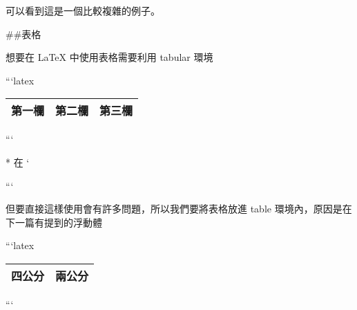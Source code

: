 \begin{markdown}
可以看到這是一個比較複雜的例子。

##表格

想要在 LaTeX 中使用表格需要利用 tabular 環境

```latex
\begin{tabular}{| c | l r |}
\hline
第一欄 & 第二欄 & 第三欄 \\
\hline
\end{tabular}
```

* 在 `
```

但要直接這樣使用會有許多問題，所以我們要將表格放進 table 環境內，原因是在下一篇有提到的浮動體

```latex
\begin{table}
\begin{tabular}{|p{4cm}|p{2cm}|}
\hline
四公分 & 兩公分 \\
\hline
\end{tabular}
\end{table}
```

\end{markdown}